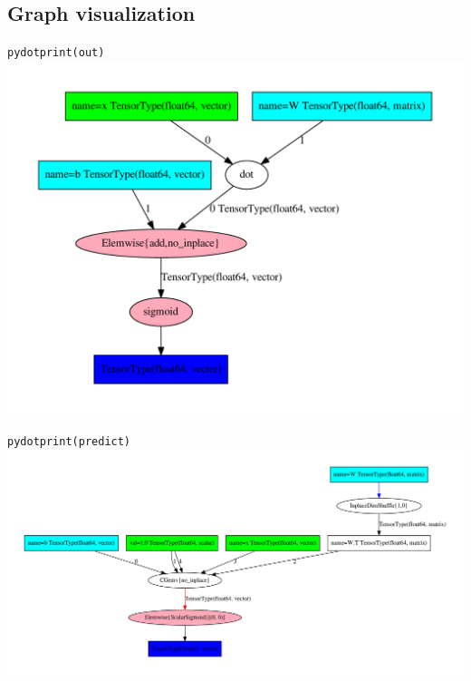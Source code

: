 \documentclass[a4paper,9pt]{beamer}
\begin{document}
\subsection{Graph visualization}
\begin{frame}{\texttt{pydotprint(out)}}
    \center
    \includegraphics[height=0.9\textheight]{pydotprint_out.pdf}
\end{frame}

\begin{frame}{\texttt{pydotprint(predict)}}
    \center
    \includegraphics[width=\textwidth]{pydotprint_predict.pdf}
\end{frame}
\end{document}
